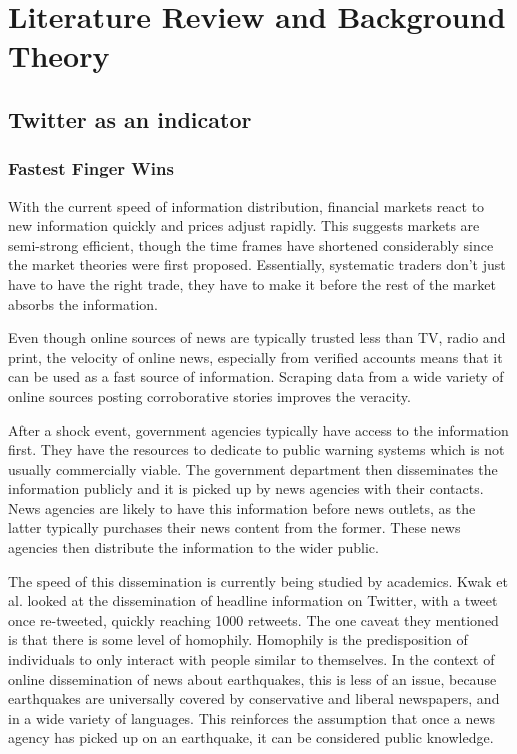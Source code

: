 \chapter{Literature Review and Background Theory}

\section{Twitter as an indicator}
\subsection{Fastest Finger Wins}

With the current speed of information distribution, financial markets react to new information quickly and prices adjust rapidly. This suggests markets are semi-strong efficient\cite{efficient_markets}, though the time frames have shortened considerably since the market theories were first proposed. Essentially, systematic traders don't just have to have the right trade, they have to make it before the rest of the market absorbs the information.

Even though online sources of news are typically trusted less than TV, radio and print\cite{modern_news}, the velocity of online news, especially from verified accounts means that it can be used as a fast source of information\cite{laney01controlling3v}. Scraping data from a wide variety of online sources posting corroborative stories improves the veracity\cite{laney01controlling3v}.

After a shock event, government agencies typically have access to the information first. They have the resources to dedicate to public warning systems which is not usually commercially viable\cite{earthquake_flow}. The government department then disseminates the information publicly and it is picked up by news agencies with their contacts. News agencies are likely to have this information before news outlets, as the latter typically purchases their news content from the former. These news agencies then distribute the information to the wider public.

The speed of this dissemination is currently being studied by academics. Kwak et al.\cite{Twitter_Kwak} looked at the dissemination of headline information on Twitter, with a tweet once re-tweeted, quickly reaching 1000 retweets. The one caveat they mentioned is that there is some level of homophily. Homophily is the predisposition of individuals to only interact with people similar to themselves. In the context of online dissemination of news about earthquakes, this is less of an issue, because earthquakes are universally covered by conservative and liberal newspapers, and in a wide variety of languages. This reinforces the assumption that once a news agency has picked up on an earthquake, it can be considered public knowledge.

